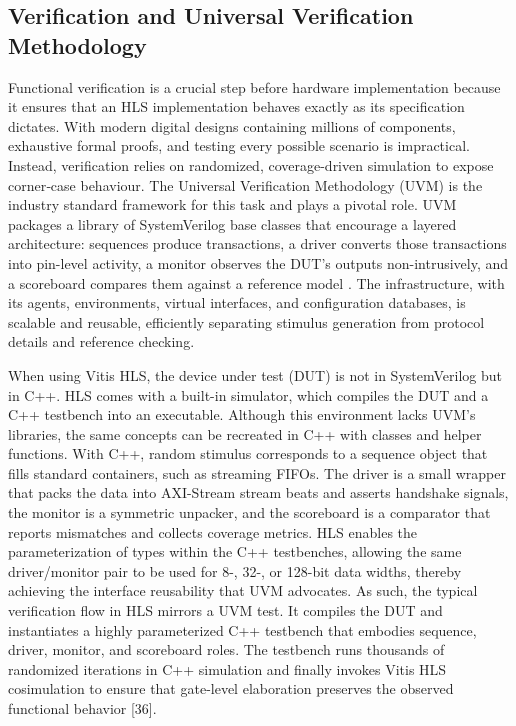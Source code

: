 \documentclass{article}
\begin{document}
    \subsection{Verification and Universal Verification Methodology}
    \noindent Functional verification is a crucial step before hardware implementation because it ensures that an HLS implementation behaves exactly as its specification dictates. With modern digital designs containing millions of components, exhaustive formal proofs, and testing every possible scenario is impractical. Instead, verification relies on randomized, coverage-driven simulation to expose corner‑case behaviour. The Universal Verification Methodology (UVM) is the industry standard framework for this task and plays a pivotal role. UVM packages a library of SystemVerilog base classes that encourage a layered architecture: sequences produce transactions, a driver converts those transactions into pin-level activity, a monitor observes the DUT's outputs non-intrusively, and a scoreboard compares them against a reference model \cite{siemens_uvm_nodate}. The infrastructure, with its agents, environments, virtual interfaces, and configuration databases, is scalable and reusable, efficiently separating stimulus generation from protocol details and reference checking.
    \par When using Vitis HLS, the device under test (DUT) is not in SystemVerilog but in C++. HLS comes with a built-in simulator, which compiles the DUT and a C++ testbench into an executable. Although this environment lacks UVM’s libraries, the same concepts can be recreated in C++ with classes and helper functions. With C++, random stimulus corresponds to a sequence object that fills standard containers, such as streaming FIFOs. The driver is a small wrapper that packs the data into AXI-Stream stream beats and asserts handshake signals, the monitor is a symmetric unpacker, and the scoreboard is a comparator that reports mismatches and collects coverage metrics. HLS enables the parameterization of types within the C++ testbenches, allowing the same driver/monitor pair to be used for 8-, 32-, or 128-bit data widths, thereby achieving the interface reusability that UVM advocates. As such, the typical verification flow in HLS mirrors a UVM test. It compiles the DUT and instantiates a highly parameterized C++ testbench that embodies sequence, driver, monitor, and scoreboard roles. The testbench runs thousands of randomized iterations in C++ simulation and finally invokes Vitis HLS cosimulation to ensure that gate-level elaboration preserves the observed functional behavior [36]. 
\end{document}
